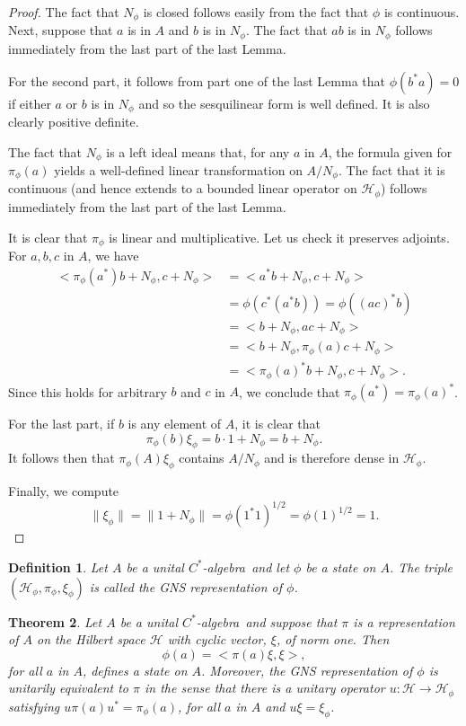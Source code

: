 \documentclass{book}
\newtheorem{definition}{Definition}[section]
\newtheorem{theorem}[definition]{Theorem}
\def\cstar{\(C^*\)-algebra}
\begin{document}
\begin{proof}
  The fact that \(N_\phi\) is closed follows easily from the fact that \(\phi\) is continuous. 
  Next, suppose that \(a\) is in \(A\) and \(b\) is in \(N_\phi\). The fact that \(ab\) is in
  \(N_\phi\) follows immediately from the last part of the last Lemma.\par
  For the second part, it follows from part one of the last Lemma that
  \(\phi(b^*a) = 0\) if either \(a\) or \(b\) is in \(N_\phi\) and so the sesquilinear form is well defined.
  It is also clearly positive definite.\par
  The fact that \(N_\phi\) is a left ideal means that, for any \(a\) in \(A\), the formula
  given for \(\pi_\phi(a)\) yields a well-defined linear transformation on \(A/N_\phi\). The fact
  that it is continuous (and hence extends to a bounded linear operator on \(\mathcal{H}_\phi\))
  follows immediately from the last part of the last Lemma.\par
  It is clear that \(\pi_\phi\) is linear and multiplicative. Let us check it preserves
  adjoints. For \(a,b,c\) in \(A\), we have
  \begin{align*}
    <\pi_\phi(a^*)b +N_\phi,c+N_\phi > &= <a^*b+N_\phi,c+N_\phi >\\
    &= \phi(c^*(a^*b)) = \phi({(ac)}^*b)\\
    &= <b+N_\phi,ac+N_\phi >\\
    &= <b+N_\phi,\pi_\phi(a)c+N_\phi >\\
    &= <{\pi_\phi(a)}^*b+N_\phi,c+N_\phi >.
  \end{align*}
  Since this holds for arbitrary \(b\) and \(c\) in \(A\), we conclude that \(\pi_\phi(a^*) = {\pi_\phi(a)}^*\).\par
  For the last part, if \(b\) is any element of \(A\), it is clear that
  \[\pi_\phi(b)\xi_\phi = b \cdot 1 +N_\phi = b+N_\phi.\]
  It follows then that \(\pi_\phi(A)\xi_\phi\) contains \(A/N_\phi\) and is therefore dense in \(\mathcal{H}_\phi\).\par
  Finally, we compute
  \[\|\xi_\phi\| = \|1+N_\phi\| ={\phi(1^*1)}^{1/2} ={\phi(1)}^{1/2} = 1.\]
\end{proof}
\begin{definition}
  Let \(A\) be a unital \cstar\ and let \(\phi\) be a state on \(A\).
  The triple \((\mathcal{H}_\phi,\pi_\phi,\xi_\phi)\) is called the \textnormal{GNS representation} of \(\phi\).
\end{definition}
\begin{theorem}
  Let \(A\) be a unital \cstar\ and suppose that \(\pi\) is a
  representation of \(A\) on the Hilbert space \(\mathcal{H}\) with cyclic vector, \(\xi\), of norm
  one. Then
  \[\phi(a) =< \pi(a)\xi,\xi >,\]
  for all \(a\) in \(A\), defines a state on \(A\). Moreover, the GNS representation of
  \(\phi\) is unitarily equivalent to \(\pi\) in the sense that there is a unitary operator
  \(u : \mathcal{H}\rightarrow \mathcal{H}_\phi\) satisfying \(u\pi(a)u^* = \pi_\phi(a)\), for all \(a\) in \(A\) and \(u\xi= \xi_\phi\).
\end{theorem}
\end{document}
